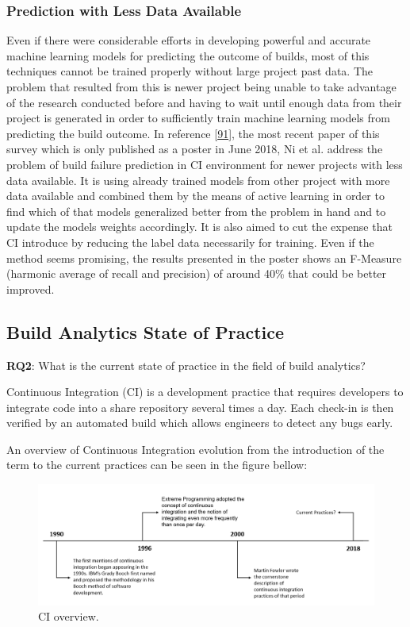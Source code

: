 \documentclass[]{book}
\begin{document}
\subsubsection{Prediction with Less Data
Available}\label{prediction-with-less-data-available}

Even if there were considerable efforts in developing powerful and
accurate machine learning models for predicting the outcome of builds,
most of this techniques cannot be trained properly without large project
past data. The problem that resulted from this is newer project being
unable to take advantage of the research conducted before and having to
wait until enough data from their project is generated in order to
sufficiently train machine learning models from predicting the build
outcome. In reference {[}\protect\hyperlink{ref-ni2018acona}{91}{]}, the
most recent paper of this survey which is only published as a poster in
June 2018, Ni et al. address the problem of build failure prediction in
CI environment for newer projects with less data available. It is using
already trained models from other project with more data available and
combined them by the means of active learning in order to find which of
that models generalized better from the problem in hand and to update
the models weights accordingly. It is also aimed to cut the expense that
CI introduce by reducing the label data necessarily for training. Even
if the method seems promising, the results presented in the poster shows
an F-Measure (harmonic average of recall and precision) of around 40\%
that could be better improved.

\subsection{Build Analytics State of
Practice}\label{build-analytics-state-of-practice}

\textbf{RQ2}: What is the current state of practice in the field of
build analytics?

Continuous Integration (CI) is a development practice that requires
developers to integrate code into a share repository several times a
day. Each check-in is then verified by an automated build which allows
engineers to detect any bugs early.

An overview of Continuous Integration evolution from the introduction of
the term to the current practices can be seen in the figure bellow:

\begin{figure}
\centering
\includegraphics{figures/build-analytics/state_pr.png}
\caption{CI overview.}
\end{figure}
\end{document}
